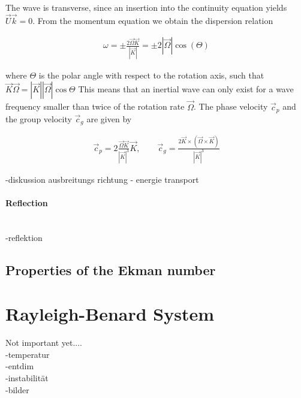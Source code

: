 The wave is transverse, since an insertion into the continuity equation yields $\vec{U}\vec{k} = 0$.
From the momentum equation we obtain the dispersion relation

\begin{align}
    \omega = \pm \frac{ 2\vec{\Omega}\vec{K}}{|\vec{K}|} = \pm 2|\vec{\Omega}|\cos(\Theta)
\end{align}

where $\Theta$ is the polar angle with respect to the rotation axis,
such that $\vec{K}\vec{\Omega} = |\vec{K}||\vec{\Omega}|\cos{\Theta}$
This means that an inertial wave can only exist for a wave frequency smaller than twice of the rotation rate $\vec{\Omega}$.
The phase velocity $\vec{c}_p$ and the group velocity $\vec{c}_g$ are given by

\begin{align}
    \vec{c}_p = 2 \frac{\vec{\Omega} \vec{K} }{|\vec{K}|^3} \vec{K}, \qquad
    \vec{c}_g = \frac{2 \vec{K} \times (\vec{\Omega} \times \vec{K})}{|\vec{K}|^3}
\end{align}

-diskussion ausbreitungs richtung
- energie transport


\paragraph{Reflection}\mbox{}\\
-reflektion

\subsection{Properties of the Ekman number}

\newpage

\section{Rayleigh-Benard System}
Not important yet.... \\
-temperatur\\
-entdim\\
-instabilität\\
-bilder\\






